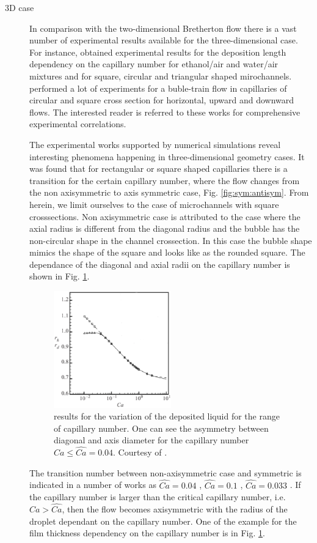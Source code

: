 \documentclass{CFD2011}
\begin{document}
\begin{description}
\item[3D case]
In comparison with the two-dimensional Bretherton flow there is a vast number of experimental
results available for the three-dimensional case. For instance, \citet{shikazono-square} obtained
experimental
results for the deposition length dependency on the
capillary number for ethanol/air and water/air mixtures and for square, circular and triangular
shaped mirochannels. \citet{cerro-bubble-train} performed a lot of experiments for a buble-train
flow in capillaries of
circular and square cross section for horizontal, upward and downward flows. The interested reader
is referred to these works for comprehensive experimental correlations.

The experimental works supported by numerical simulations reveal interesting phenomena happening in
three-dimensional geometry cases. It was found \cite{heil-threedim,wong-films} that for rectangular
or square shaped capillaries there is a transition for the
certain capillary number, where the flow changes from the non axisymmetric to axis symmetric case,
Fig. \ref{fig:sym:antisym}.
From herein, we limit ourselves to the case of microchannels with square crosssections.
Non axisymmetric case is attributed to the case where the axial radius is different from the
diagonal radius and the bubble has the non-circular shape in the channel crossection. In this case
the bubble shape mimics the shape of the square and looks like as the rounded square. The dependance
of the diagonal and axial radii on the capillary number is shown in Fig. 
\ref{fig:heil:three:dim}.
\begin{figure}[ht]
\includegraphics[width=0.5\textwidth]{Figures/capillary_width_heil.eps}
\caption{\citet{heil-threedim} results for the variation of the deposited liquid for the range of
capillary number. One can see the asymmetry between diagonal and axis diameter for the capillary
number $Ca\leq\hat{Ca}=0.04$. Courtesy of \citet{heil-threedim}. \label{fig:heil:three:dim}}
\end{figure}
The transition number between non-axisymmetric case and symmetric is indicated in a number of
works as $\widehat{Ca}=0.04$ \cite{cerro-bubble-train},
$\widehat{Ca}=0.1$
\cite{cerro-space}, $\widehat{Ca}=0.033$ \cite{heil-threedim}. If the capillary number is larger
than
the critical capillary number, i.e. $Ca>\widehat{Ca}$, then the flow becomes axisymmetric with the
radius of the droplet dependant on the capillary number. One of the example for the film
thickness dependency on the capillary number is in Fig. \ref{fig:heil:three:dim}.


\end{description}
\end{document}
